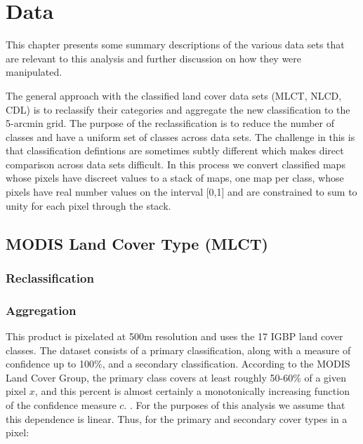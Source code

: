 
\chapter{Data}
\label{cha:data}

This chapter presents some summary descriptions of the various data
sets that are relevant to this analysis and further discussion on how
they were manipulated.

The general approach with the classified land cover data sets (MLCT,
NLCD, CDL) is to reclassify their categories and aggregate the new
classification to the 5-arcmin grid.  The purpose of the
reclassification is to reduce the number of classes and have a uniform
set of classes across data sets.  The challenge in this is that
classification defintions are sometimes subtly different which makes
direct comparison across data sets difficult.  In this process we
convert classified maps whose pixels have discreet values to a stack
of maps, one map per class, whose pixels have real number values on
the interval [0,1] and are constrained to sum to unity for each pixel
through the stack.


\section{MODIS Land Cover Type (MLCT)}
\label{sec:mlct}

\subsection{Reclassification}
\label{sec:mlct-reclass}


\subsection{Aggregation}
\label{sec:mlct-aggr}

This product is pixelated at 500m resolution and uses the 17 IGBP land
cover classes. The dataset consists of a primary classification, along
with a measure of confidence up to 100\%, and a secondary
classification.  According to the MODIS Land Cover Group, the primary
class covers at least roughly 50-60\% of a given pixel $x$, and this
percent is almost certainly a monotonically increasing function of the
confidence measure $c$.  .  For the
purposes of this analysis we assume that this dependence is
linear. Thus, for the primary and secondary cover types in a pixel:

